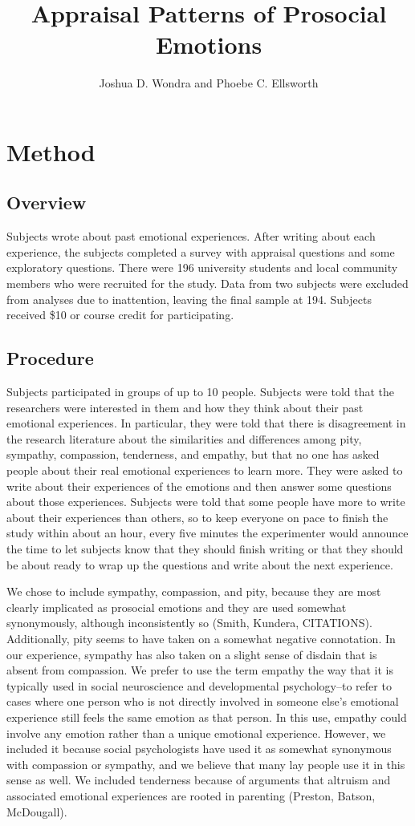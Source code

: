 \documentclass[man]{apa6}
\title{Appraisal Patterns of Prosocial Emotions}
\author{Joshua D. Wondra and Phoebe C. Ellsworth}
\affiliation{University of Michigan}
\begin{document}


\maketitle

\section{Method}
\subsection{Overview}
Subjects wrote about past emotional experiences. After writing about each experience, the subjects completed a survey with appraisal questions and some exploratory questions. There were 196 university students and local community members who were recruited for the study. Data from two subjects were excluded from analyses due to inattention, leaving the final sample at 194. Subjects received \$10 or course credit for participating. 
\subsection{Procedure}
Subjects participated in groups of up to 10 people. Subjects were told that the researchers were interested in them and how they think about their past emotional experiences. In particular, they were told that there is disagreement in the research literature about the similarities and differences among pity, sympathy, compassion, tenderness, and empathy, but that no one has asked people about their real emotional experiences to learn more. They were asked to write about their experiences of the emotions and then answer some questions about those experiences. Subjects were told that some people have more to write about their experiences than others, so to keep everyone on pace to finish the study within about an hour, every five minutes the experimenter would announce the time to let subjects know that they should finish writing or that they should be about ready to wrap up the questions and write about the next experience.

We chose to include sympathy, compassion, and pity, because they are most clearly implicated as prosocial emotions and they are used somewhat synonymously, although inconsistently so (Smith, Kundera, CITATIONS). Additionally, pity seems to have taken on a somewhat negative connotation. In our experience, sympathy has also taken on a slight sense of disdain that is absent from compassion. We prefer to use the term empathy the way that it is typically used in social neuroscience and developmental psychology--to refer to cases where one person who is not directly involved in someone else's emotional experience still feels the same emotion as that person. In this use, empathy could involve any emotion rather than a unique emotional experience. However, we included it because social psychologists have used it as somewhat synonymous with compassion or sympathy, and we believe that many lay people use it in this sense as well. We included tenderness because of arguments that altruism and associated emotional experiences are rooted in parenting (Preston, Batson, McDougall).
\end{document}
